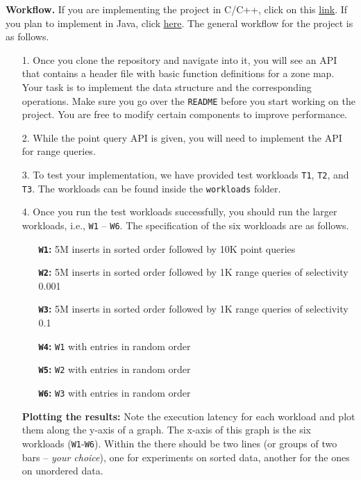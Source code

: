\documentclass[12pt,a4paper,twoside]{article}
\begin{document}
\noindent \textbf{Workflow.} If you are implementing the project in C/C++, click on this \href{https://github.com/SSD-Brandeis/ZoneMaps-CPP}{\underline{link}}. 
If you plan to implement in Java, click \href{https://github.com/SSD-Brandeis/ZoneMaps-Java}{\underline{here}}. 
The general workflow for the project is as follows.

\begin{enumerate}
    \item[1.] Once you clone the repository and navigate into it, you will see an API that contains a header file with basic function definitions for a zone map. Your task is to implement the data structure and the corresponding operations. 
    Make sure you go over the \texttt{README} before you start working on the project. 
    You are free to modify certain components to improve performance. 
    \item[2.] While the point query API is given, you will need to implement the API for range queries. 
    \item[3.] To test your implementation, we have provided test workloads \texttt{T1}, \texttt{T2}, and \texttt{T3}. The workloads can be found inside the \texttt{workloads} folder. 
    \item[4.] Once you run the test workloads successfully, you should run the larger workloads, i.e., \texttt{W1} -- \texttt{W6}. 
    The specification of the six workloads are as follows. 
    \begin{enumerate}
        \item[\textbf{\texttt{W1}:}] 5M inserts in sorted order followed by 10K point queries 
        \item[\textbf{\texttt{W2}:}] 5M inserts in sorted order followed by 1K range queries of selectivity 0.001
        \item[\textbf{\texttt{W3}:}] 5M inserts in sorted order followed by 1K range queries of selectivity 0.1
        \item[\textbf{\texttt{W4}:}] \texttt{W1} with entries in random order
        \item[\textbf{\texttt{W5}:}] \texttt{W2} with entries in random order
        \item[\textbf{\texttt{W6}:}] \texttt{W3} with entries in random order
    \end{enumerate}
    \textbf{Plotting the results:} Note the execution latency for each workload and plot them along the y-axis of a graph. 
    The x-axis of this graph is the six workloads (\texttt{W1}-\texttt{W6}). 
    Within the there should be two lines (or groups of two bars -- \textit{your choice}), one for experiments on sorted data, another for the ones on unordered data. 

\end{enumerate}
\end{document}
